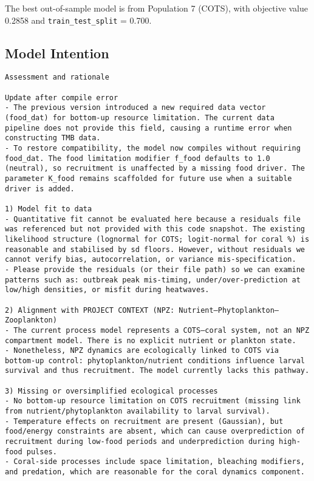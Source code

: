 The best out-of-sample model is from Population 7 (COTS), with objective value 0.2858 and \texttt{train\_test\_split} = 0.700.

\subsection{Model Intention}
\begin{lstlisting}
Assessment and rationale

Update after compile error
- The previous version introduced a new required data vector (food_dat) for bottom-up resource limitation. The current data pipeline does not provide this field, causing a runtime error when constructing TMB data.
- To restore compatibility, the model now compiles without requiring food_dat. The food limitation modifier f_food defaults to 1.0 (neutral), so recruitment is unaffected by a missing food driver. The parameter K_food remains scaffolded for future use when a suitable driver is added.

1) Model fit to data
- Quantitative fit cannot be evaluated here because a residuals file was referenced but not provided with this code snapshot. The existing likelihood structure (lognormal for COTS; logit-normal for coral %) is reasonable and stabilised by sd floors. However, without residuals we cannot verify bias, autocorrelation, or variance mis-specification.
- Please provide the residuals (or their file path) so we can examine patterns such as: outbreak peak mis-timing, under/over-prediction at low/high densities, or misfit during heatwaves.

2) Alignment with PROJECT CONTEXT (NPZ: Nutrient–Phytoplankton–Zooplankton)
- The current process model represents a COTS–coral system, not an NPZ compartment model. There is no explicit nutrient or plankton state.
- Nonetheless, NPZ dynamics are ecologically linked to COTS via bottom-up control: phytoplankton/nutrient conditions influence larval survival and thus recruitment. The model currently lacks this pathway.

3) Missing or oversimplified ecological processes
- No bottom-up resource limitation on COTS recruitment (missing link from nutrient/phytoplankton availability to larval survival).
- Temperature effects on recruitment are present (Gaussian), but food/energy constraints are absent, which can cause overprediction of recruitment during low-food periods and underprediction during high-food pulses.
- Coral-side processes include space limitation, bleaching modifiers, and predation, which are reasonable for the coral dynamics component.


\end{lstlisting}
